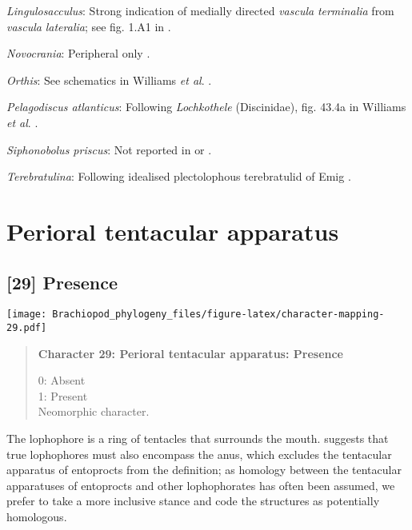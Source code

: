 \documentclass[openany]{book}
\theoremstyle{definition}
\theoremstyle{definition}
\theoremstyle{definition}
\theoremstyle{remark}
\begin{document}
\hypertarget{Lingulosacculus-coding-28}{}
\emph{Lingulosacculus}: Strong indication of medially directed
\emph{vascula} \emph{terminalia} from \emph{vascula} \emph{lateralia};
see fig. 1.A1 in \citet{Balthasar2009EarlyCambrian}.

\hypertarget{Novocrania-coding-28}{}
\emph{Novocrania}: Peripheral only
\citep[p.158]{Williams2000LinguliformeaCraniiformea}.

\hypertarget{Orthis-coding-28}{}
\emph{Orthis}: See schematics in Williams \emph{et al}.
\citeyearpar{Williams2000LinguliformeaCraniiformea}.

\hypertarget{Pelagodiscus_atlanticus-coding-28}{}
\emph{Pelagodiscus atlanticus}: Following \emph{Lochkothele}
(Discinidae), fig. 43.4a in Williams \emph{et al}.
\citeyearpar{Williams2000LinguliformeaCraniiformea}.

\hypertarget{Siphonobolus_priscus-coding-28}{}
\emph{Siphonobolus priscus}: Not reported in
\citet{Havlicek1982LingulaceaPaterinacea} or
\citet{Williams2000LinguliformeaCraniiformea}.

\hypertarget{Terebratulina-coding-28}{}
\emph{Terebratulina}: Following idealised plectolophous terebratulid of
Emig \citeyearpar{Emig1992Functionaldisposition}.

\section{Perioral tentacular
apparatus}\label{perioral-tentacular-apparatus}

\subsection*{{[}29{]} Presence}\label{presence-1}

\texttt{[image: Brachiopod\_phylogeny\_files/figure-latex/character-mapping-29.pdf]}

\begin{quote}
\textbf{Character 29: Perioral tentacular apparatus: Presence}

0: Absent\\
1: Present\\
Neomorphic character.
\end{quote}

The lophophore is a ring of tentacles that surrounds the mouth.
\citet{Temereva2017Innervationof} suggests that true lophophores must
also encompass the anus, which excludes the tentacular apparatus of
entoprocts from the definition; as homology between the tentacular
apparatuses of entoprocts and other lophophorates has often been
assumed, we prefer to take a more inclusive stance and code the
structures as potentially homologous.
\end{document}

